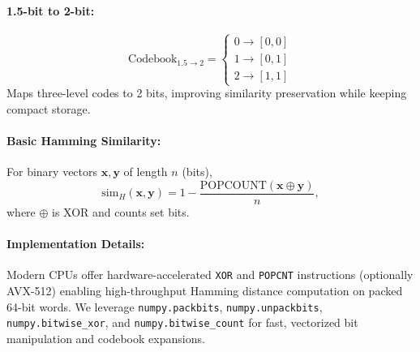 \paragraph{1.5-bit to 2-bit:}
\begin{equation}
\text{Codebook}_{1.5\rightarrow2} =
\begin{cases}
0 \rightarrow [0,0]\\
1 \rightarrow [0,1]\\
2 \rightarrow [1,1]
\end{cases}
\end{equation}
Maps three-level codes to 2 bits, improving similarity preservation while keeping compact storage.

\paragraph{Basic Hamming Similarity:}
For binary vectors $\mathbf{x}, \mathbf{y}$ of length $n$ (bits),
\begin{equation}
    \text{sim}_H(\mathbf{x}, \mathbf{y}) 
    = 
    1 - \frac{\text{POPCOUNT}(\mathbf{x} \oplus \mathbf{y})}{n},
\end{equation}
where $\oplus$ is XOR and  counts set bits.

\paragraph{Implementation Details:} 
Modern CPUs offer hardware-accelerated \texttt{XOR} and \texttt{POPCNT} instructions (optionally AVX-512) enabling high-throughput Hamming distance computation on packed 64-bit words.
We leverage \texttt{numpy.packbits}, \texttt{numpy.unpackbits}, \texttt{numpy.bitwise\_xor}, and \texttt{numpy.bitwise\_count} for fast, vectorized bit manipulation and codebook expansions.
